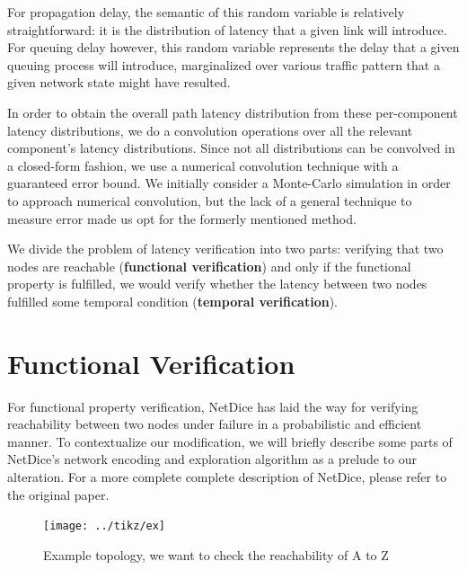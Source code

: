 \documentclass[10pt,sigconf,letterpaper,anonymous,nonacm]{acmart}
\begin{document}
For propagation delay, the semantic of this random variable is relatively straightforward: it is 
the distribution of latency that a given link will introduce.
For queuing delay however, this random variable represents the delay that a given queuing process 
will introduce, marginalized over various traffic pattern that a given network state might have 
resulted.

In order to obtain the overall path latency distribution from these per-component latency 
distributions, we do a convolution operations over all the relevant component's latency 
distributions.
Since not all distributions can be convolved in a closed-form fashion, we use a numerical 
convolution technique with a guaranteed error bound. 
We initially consider a Monte-Carlo simulation in order to approach numerical convolution, but 
the lack of a general technique to measure error made us opt for the formerly mentioned method.



We divide the problem of latency verification into two parts: 
verifying that two nodes are reachable (\textbf{functional verification}) and only if 
the functional property is fulfilled, we would verify whether the latency between 
two nodes fulfilled some temporal condition (\textbf{temporal verification}).

\section{Functional Verification}
For functional property verification, NetDice \cite{steffen2020probabilistic} 
has laid the way for verifying reachability between two nodes under failure in a 
probabilistic and efficient manner.
To contextualize our modification, we will briefly describe some parts of 
NetDice's network encoding and exploration algorithm as a prelude to our alteration.
For a more complete complete description of NetDice, please refer to the original 
paper.

\begin{figure}[h]
    \centering
    \texttt{[image: ../tikz/ex]}
    \caption{Example topology, we want to check the reachability of A to Z}
    \label{fig:ex}
\end{figure}
\end{document}
